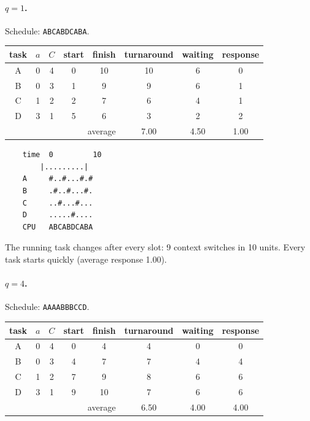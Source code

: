 \paragraph{$q = 1$.} Schedule: \texttt{ABCABDCABA}.
\begin{center}
    \begin{tabular}{c c c | c c c c c}
        \hline
        task & $a$ & $C$ & start & finish & turnaround & waiting & response \\
        \hline
        A & 0 & 4 & 0 & 10 & 10 & 6 & 0 \\
        B & 0 & 3 & 1 & 9 & 9 & 6 & 1 \\
        C & 1 & 2 & 2 & 7 & 6 & 4 & 1 \\
        D & 3 & 1 & 5 & 6 & 3 & 2 & 2 \\
        \hline
        \multicolumn{5}{r}{average} & 7.00 & 4.50 & 1.00 \\
    \end{tabular}
\end{center}

\begin{verbatim}
    time  0         10
        |.........|
    A     #..#...#.#
    B     .#..#...#.
    C     ..#...#...
    D     .....#....
    CPU   ABCABDCABA
\end{verbatim}

The running task changes after every slot: 9 context switches in 10 units. Every task starts quickly (average response 1.00).

\paragraph{$q = 4$.} Schedule: \texttt{AAAABBBCCD}.
\begin{center}
    \begin{tabular}{c c c | c c c c c}
        \hline
        task & $a$ & $C$ & start & finish & turnaround & waiting & response \\
        \hline
        A & 0 & 4 & 0 & 4 & 4 & 0 & 0 \\
        B & 0 & 3 & 4 & 7 & 7 & 4 & 4 \\
        C & 1 & 2 & 7 & 9 & 8 & 6 & 6 \\
        D & 3 & 1 & 9 & 10 & 7 & 6 & 6 \\
        \hline
        \multicolumn{5}{r}{average} & 6.50 & 4.00 & 4.00 \\
    \end{tabular}
\end{center}

